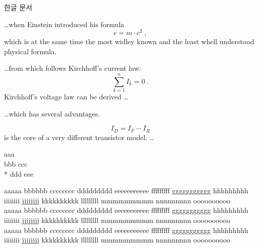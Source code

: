 \documentclass[a4paper, 11pt]{article}
\begin{document}
한글 문서













\ldots when Einstein introduced his formula
\begin{equation}
  e = m \cdot c^2 \; ,
\end{equation}
which is at the same time the most widley known
and the least whell understood physical formula.



\ldots from which follows Kirchhoff's current law:
\begin{equation}
  \sum_{k=1}^{n} I_k = 0 \; .
\end{equation}
Kirchhoff's voltage law can be derived \ldots

\ldots which has several advantages.

\begin{equation}
 I_D = I_F - I_R
\end{equation}
is the core of a very different transistor model. \ldots





aaa
\\
bbb
\newline
ccc
\\*
ddd
\newpage
eee





aaaaa bbbbbb cccccccc ddddddddd eeeeeeeeeee fffffffff ggggggggggg hhhhhhhhh 
iiiiiiii jjjjjjjj kkkkkkkkkk lllllllll mmmmmmmmm nnnnnnnnn oooooooooo\
\\

\sloppy
aaaaa bbbbbb cccccccc ddddddddd eeeeeeeeeee fffffffff ggggggggggg hhhhhhhhh 
iiiiiiii jjjjjjjj kkkkkkkkkk lllllllll mmmmmmmmm nnnnnnnnn oooooooooo
\\

\fussy
aaaaa bbbbbb cccccccc ddddddddd eeeeeeeeeee fffffffff ggggggggggg hhhhhhhhh 
iiiiiiii jjjjjjjj kkkkkkkkkk lllllllll mmmmmmmmm nnnnnnnnn oooooooooo
\\
\end{document}
